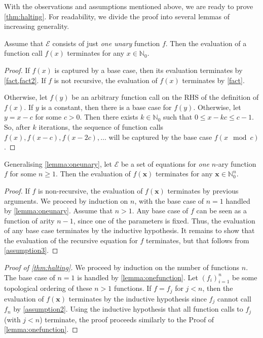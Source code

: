 \documentclass[a4paper,UKenglish,cleveref, autoref, thm-restate]{lipics-v2021}
\begin{document}
With the observations and assumptions mentioned above, we are ready to prove
\cref{thm:halting}. For readability, we divide the proof into several lemmas of
increasing generality.

\begin{lemma}\label{lemma:oneunary}
  Assume that $\mathcal{E}$ consists of just \emph{one unary} function $f$. Then
  the evaluation of a function call $f(x)$ terminates for any
  $x \in \mathbb{N}_{0}$.
\end{lemma}
\begin{proof}
  If $f(x)$ is captured by a base case, then its evaluation terminates by
  \cref{fact,fact2}. If $f$ is not recursive, the evaluation of
  $f(x)$ terminates by \cref{fact}.

  Otherwise, let $f(y)$ be an arbitrary function call on the RHS of the
  definition of $f(x)$. If $y$ is a constant, then there is a base case for
  $f(y)$. Otherwise, let $y = x - c$ for some $c > 0$. Then there exists
  $k \in \mathbb{N}_{0}$ such that $0 \le x - kc \le c-1$. So, after $k$
  iterations, the sequence of function calls $f(x), f(x-c), f(x-2c),\dots$ will
  be captured by the base case $f(x \mod c)$.
\end{proof}

\begin{lemma}\label{lemma:onefunction}
  Generalising \cref{lemma:oneunary}, let $\mathcal{E}$ be a set of equations
  for \emph{one} $n$-ary function $f$ for some $n \ge 1$. Then the evaluation of
  $f(\mathbf{x})$ terminates for any $\mathbf{x} \in \mathbb{N}_{0}^{n}$.
\end{lemma}
\begin{proof}
  If $f$ is non-recursive, the evaluation of $f(\mathbf{x})$ terminates by
  previous arguments. We proceed by induction on $n$, with the base case of
  $n=1$ handled by \cref{lemma:oneunary}. Assume that $n > 1$. Any base case of
  $f$ can be seen as a function of arity $n-1$, since one of the parameters is
  fixed. Thus, the evaluation of any base case terminates by the inductive
  hypothesis. It remains to show that the evaluation of the recursive equation
  for $f$ terminates, but that follows from \cref{assumption3}.
\end{proof}

\begin{proof}[Proof of \cref{thm:halting}]
  We proceed by induction on the number of functions $n$. The base case of $n=1$
  is handled by \cref{lemma:onefunction}. Let ${(f_{i})}_{i=1}^{n}$ be some
  topological ordering of these $n > 1$ functions. If $f = f_{j}$ for $j < n$,
  then the evaluation of $f(\mathbf{x})$ terminates by the inductive hypothesis
  since $f_{j}$ cannot call $f_{n}$ by \cref{assumption2}. Using the inductive
  hypothesis that all function calls to $f_{j}$ (with $j < n$) terminate, the
  proof proceeds similarly to the Proof of \cref{lemma:onefunction}.
\end{proof}
\end{document}
